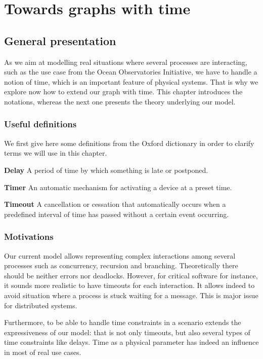 \documentclass[a4paper,11pt,twoside]{report}
\begin{document}
\chapter{Towards graphs with time}

\section{General presentation}
As we aim at modelling real situations where several processes are interacting, such as the use case from the Ocean Observatories Initiative, we have to handle a notion of time, which is an important feature of physical systems. That is why we explore now how to extend our graph with time. This chapter introduces the notations, whereas the next one presents the theory underlying our model.

\subsection{Useful definitions}
We first give here some definitions from the Oxford dictionary in order to clarify terms we will use in this chapter.

\textbf{Delay} A period of time by which something is late or postponed.

\textbf{Timer} An automatic mechanism for activating a device at a preset time.

\textbf{Timeout} A cancellation or cessation that automatically occurs when a predefined interval of time has passed without a certain event occurring.


\subsection{Motivations}
Our current model allows representing complex interactions among several processes such as concurrency, recursion and branching. Theoretically there should be neither errors nor deadlocks. However, for critical software for instance, it sounds more realistic to have timeouts for each interaction. It allows indeed to avoid situation where a process is stuck waiting for a message. This is major issue for distributed systems.

Furthermore, to be able to handle time constraints in a scenario extends the expressiveness of our model: that is not only timeouts, but also several types of time constraints like delays. Time as a physical parameter has indeed an influence in most of real use cases.
\end{document}
